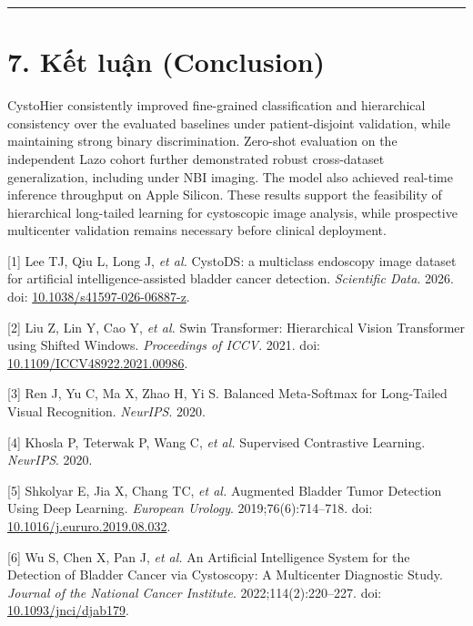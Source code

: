 \documentclass[
  10pt,
  a4paper,
  twocolumn]{article}
\begin{document}
\begin{center}\rule{0.5\linewidth}{0.5pt}\end{center}

\section{7. Kết luận (Conclusion)}\label{kux1ebft-luux1eadn-conclusion}

CystoHier consistently improved fine-grained classification and
hierarchical consistency over the evaluated baselines under
patient-disjoint validation, while maintaining strong binary
discrimination. Zero-shot evaluation on the independent Lazo cohort
further demonstrated robust cross-dataset generalization, including
under NBI imaging. The model also achieved real-time inference
throughput on Apple Silicon. These results support the feasibility of
hierarchical long-tailed learning for cystoscopic image analysis, while
prospective multicenter validation remains necessary before clinical
deployment.

{[}1{]} Lee TJ, Qiu L, Long J, \emph{et al.} CystoDS: a multiclass
endoscopy image dataset for artificial intelligence-assisted bladder
cancer detection. \emph{Scientific Data}. 2026. doi:
\href{https://doi.org/10.1038/s41597-026-06887-z}{10.1038/s41597-026-06887-z}.

{[}2{]} Liu Z, Lin Y, Cao Y, \emph{et al.} Swin Transformer:
Hierarchical Vision Transformer using Shifted Windows. \emph{Proceedings
of ICCV}. 2021. doi:
\href{https://doi.org/10.1109/ICCV48922.2021.00986}{10.1109/ICCV48922.2021.00986}.

{[}3{]} Ren J, Yu C, Ma X, Zhao H, Yi S. Balanced Meta-Softmax for
Long-Tailed Visual Recognition. \emph{NeurIPS}. 2020.

{[}4{]} Khosla P, Teterwak P, Wang C, \emph{et al.} Supervised
Contrastive Learning. \emph{NeurIPS}. 2020.

{[}5{]} Shkolyar E, Jia X, Chang TC, \emph{et al.} Augmented Bladder
Tumor Detection Using Deep Learning. \emph{European Urology}.
2019;76(6):714--718. doi:
\href{https://doi.org/10.1016/j.eururo.2019.08.032}{10.1016/j.eururo.2019.08.032}.

{[}6{]} Wu S, Chen X, Pan J, \emph{et al.} An Artificial Intelligence
System for the Detection of Bladder Cancer via Cystoscopy: A Multicenter
Diagnostic Study. \emph{Journal of the National Cancer Institute}.
2022;114(2):220--227. doi:
\href{https://doi.org/10.1093/jnci/djab179}{10.1093/jnci/djab179}.
\end{document}
